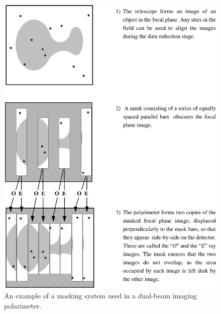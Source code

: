 \begin{latexonly}
  \begin{figure}[p]
  \begin{center}
  \includegraphics[scale=0.8]{sun223_figures/grids.eps}
  \caption{An example of a masking system used in a dual-beam imaging polarimeter.}
  \label{fig:grids}
  \end{center}
  \end{figure}
\end{latexonly}
